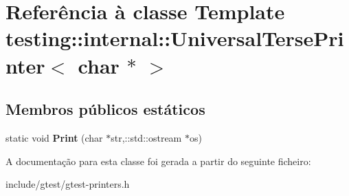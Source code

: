 \hypertarget{classtesting_1_1internal_1_1UniversalTersePrinter_3_01char_01_5_01_4}{\section{Referência à classe Template testing\-:\-:internal\-:\-:Universal\-Terse\-Printer$<$ char $\ast$ $>$}
\label{classtesting_1_1internal_1_1UniversalTersePrinter_3_01char_01_5_01_4}
}
\subsection*{Membros públicos estáticos}
\begin{DoxyCompactItemize}
\item 
\hypertarget{classtesting_1_1internal_1_1UniversalTersePrinter_3_01char_01_5_01_4_a88c426f4af279251b4f4a02cd55ab57c}{static void {\bfseries Print} (char $\ast$str,\-::std\-::ostream $\ast$os)}\label{classtesting_1_1internal_1_1UniversalTersePrinter_3_01char_01_5_01_4_a88c426f4af279251b4f4a02cd55ab57c}

\end{DoxyCompactItemize}


A documentação para esta classe foi gerada a partir do seguinte ficheiro\-:\begin{DoxyCompactItemize}
\item 
include/gtest/gtest-\/printers.\-h\end{DoxyCompactItemize}
